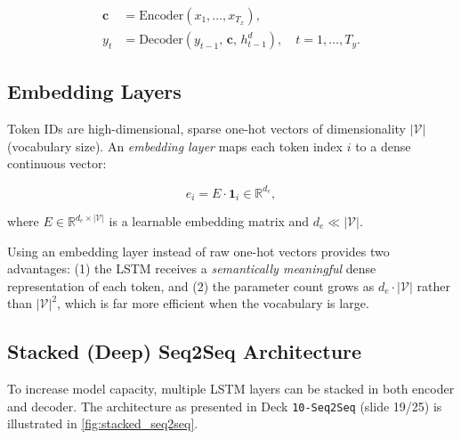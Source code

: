 \documentclass[12pt,a4paper]{article}
\begin{document}
\begin{align}
  \mathbf{c} &= \text{Encoder}(x_1, \ldots, x_{T_x}), \label{eq:encoder} \\
  y_t &= \text{Decoder}(y_{t-1},\, \mathbf{c},\, h^d_{t-1}), \quad
         t = 1, \ldots, T_y. \label{eq:decoder}
\end{align}

\subsection{Embedding Layers}
\label{subsec:embedding}

Token IDs are high-dimensional, sparse one-hot vectors of dimensionality
$|\mathcal{V}|$ (vocabulary size).  An \emph{embedding layer} maps each token
index $i$ to a dense continuous vector:

\begin{equation}
  e_i = E \cdot \mathbf{1}_i \in \mathbb{R}^{d_e},
  \label{eq:embedding}
\end{equation}

where $E \in \mathbb{R}^{d_e \times |\mathcal{V}|}$ is a learnable embedding
matrix and $d_e \ll |\mathcal{V}|$.

\begin{keyinsight}
  Using an embedding layer instead of raw one-hot vectors provides two
  advantages: (1) the LSTM receives a \emph{semantically meaningful} dense
  representation of each token, and (2) the parameter count grows as
  $d_e \cdot |\mathcal{V}|$ rather than $|\mathcal{V}|^2$, which is far more
  efficient when the vocabulary is large.
\end{keyinsight}

\subsection{Stacked (Deep) Seq2Seq Architecture}
\label{subsec:stacked_seq2seq}

To increase model capacity, multiple LSTM layers can be stacked in both
encoder and decoder.  The architecture as presented in Deck \texttt{10-Seq2Seq}
(slide 19/25) is illustrated in \cref{fig:stacked_seq2seq}.
\end{document}
